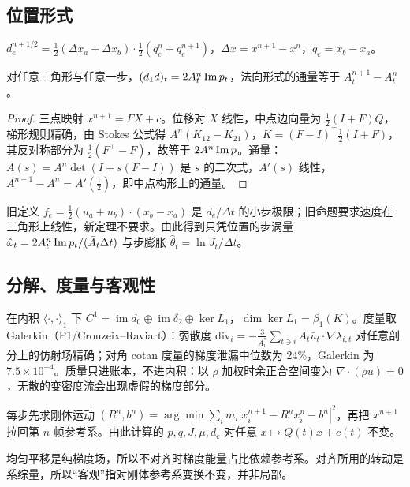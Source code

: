 \subsection{位置形式}
\begin{definition}[中点位移上链]
$d_e^{n+1/2}=\tfrac12(\Delta x_a+\Delta x_b)\cdot\tfrac12(q_e^n+q_e^{n+1})$，$\Delta x=x^{n+1}-x^n$，$q_e=x_b-x_a$。
\end{definition}
\begin{theorem}[有限步环量与通量]
对任意三角形与任意一步，$(d_1d)_t=2A_t^n\operatorname{Im} p_t$，法向形式的通量等于 $A_t^{n+1}-A_t^n$。
\end{theorem}
\begin{proof}
三点映射 $x^{n+1}=FX+c$。位移对 $X$ 线性，中点边向量为 $\tfrac12(I+F)Q$，梯形规则精确，由 Stokes 公式得 $A^n(K_{12}-K_{21})$，$K=(F-I)^\top\tfrac12(I+F)$，其反对称部分为 $\tfrac12(F^\top-F)$，故等于 $2A^n\operatorname{Im} p$。通量：$A(s)=A^n\det(I+s(F-I))$ 是 $s$ 的二次式，$A'(s)$ 线性，$A^{n+1}-A^n=A'(\tfrac12)$，即中点构形上的通量。
\end{proof}
旧定义 $f_e=\tfrac12(u_a+u_b)\cdot(x_b-x_a)$ 是 $d_e/\Delta t$ 的小步极限；旧命题要求速度在三角形上线性，新定理不要求。由此得到只凭位置的步涡量 $\hat\omega_t=2A^n_t\operatorname{Im} p_t/(\bar A_t\Delta t)$ 与步膨胀 $\hat\theta_t=\ln J_t/\Delta t$。

\subsection{分解、度量与客观性}
在内积 $\langle\cdot,\cdot\rangle_1$ 下 $C^1=\operatorname{im}d_0\oplus\operatorname{im}\delta_2\oplus\ker L_1$，$\dim\ker L_1=\beta_1(K)$。度量取 Galerkin（P1/Crouzeix–Raviart）：弱散度 $\mathrm{div}_i=-\tfrac{3}{A^\ast_i}\sum_{t\ni i}A_t\bar u_t\cdot\nabla\lambda_{i,t}$ 对任意剖分上的仿射场精确；对角 cotan 度量的梯度泄漏中位数为 24\%，Galerkin 为 $7.5\times10^{-4}$。质量只进账本，不进内积：以 $\rho$ 加权时余正合空间变为 $\nabla\cdot(\rho u)=0$，无散的变密度流会出现虚假的梯度部分。

\begin{proposition}[Kabsch 对齐]
每步先求刚体运动 $(R^n,b^n)=\arg\min\sum_im_i|x_i^{n+1}-R^nx_i^n-b^n|^2$，再把 $x^{n+1}$ 拉回第 $n$ 帧参考系。由此计算的 $p,q,J,\mu,d_e$ 对任意 $x\mapsto Q(t)x+c(t)$ 不变。
\end{proposition}
均匀平移是纯梯度场，所以不对齐时梯度能量占比依赖参考系。对齐所用的转动是系综量，所以“客观”指对刚体参考系变换不变，并非局部。

